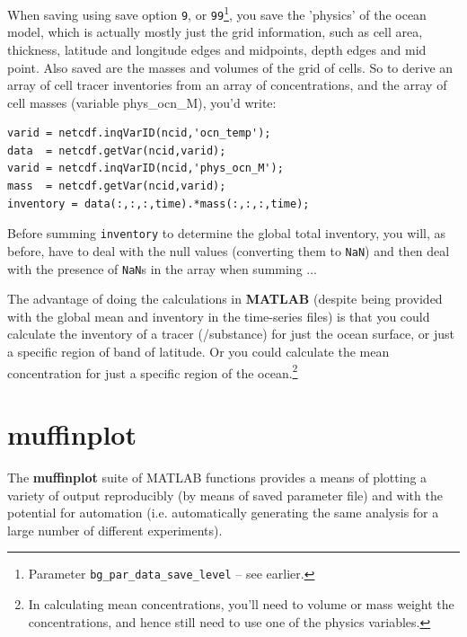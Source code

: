 \documentclass[11pt,fleqn]{book} %
\begin{document}
When saving using save option \texttt{9}, or \texttt{99}\footnote{Parameter \texttt{bg\_par\_data\_save\_level} -- see earlier.}, you save the 'physics' of the ocean model, which is actually mostly just the grid information, such as cell area, thickness, latitude and longitude edges and midpoints, depth edges and mid point. Also saved are the masses and volumes of the grid of cells. So to derive an array of cell tracer inventories from an array of concentrations, and the array of cell masses (variable \textsf{\footnotesize phys\_ocn\_M}), you'd write:
\small\begin{verbatim}
varid = netcdf.inqVarID(ncid,'ocn_temp');
data  = netcdf.getVar(ncid,varid);
varid = netcdf.inqVarID(ncid,'phys_ocn_M');
mass  = netcdf.getVar(ncid,varid);
inventory = data(:,:,:,time).*mass(:,:,:,time);
\end{verbatim}\normalsize
\noindent Before summing \texttt{inventory} to determine the global total inventory, you will, as before, have to deal with the null values (converting them to \texttt{NaN}) and then deal with the presence of \texttt{NaN}s in the array when summing ...

The advantage of doing the calculations in \textbf{MATLAB} (despite being provided with the global mean and inventory in the time-series files) is that you could calculate the inventory of a tracer (/substance) for just the ocean surface, or just a specific region of band of latitude. Or you could calculate the mean concentration for just a specific region of the ocean.\footnote{In calculating mean concentrations, you'll need to volume or mass weight the concentrations, and hence still need to use one of the physics variables.}


\cleardoublepage


\chapter{muffinplot}

\hfill \break

\vspace{24mm}

\noindent The \textbf{muffinplot} suite of MATLAB functions provides a means of plotting a variety of output reproducibly (by means of  saved parameter file) and with the potential for automation (i.e. automatically generating the same analysis for a large number of different experiments).
\end{document}
